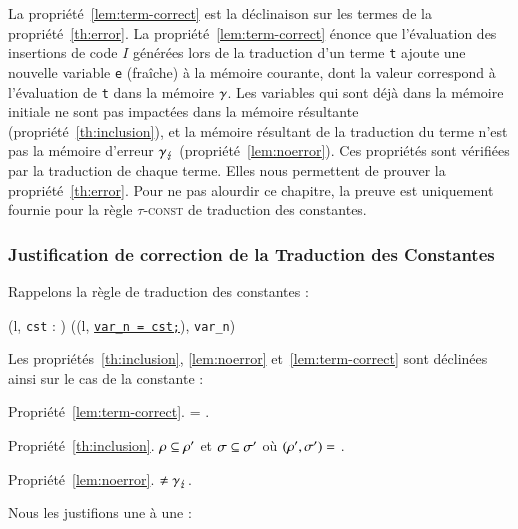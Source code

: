 La propriété~\ref{lem:term-correct} est la déclinaison sur les termes de la
propriété~\ref{th:error}.
La propriété~\ref{lem:term-correct} énonce que l'évaluation des insertions de
code $I$ générées lors de la traduction d'un terme \lstinline't' ajoute une
nouvelle variable \lstinline'e' (fraîche) à la mémoire courante, dont la valeur
correspond à l'évaluation de \lstinline't' dans la mémoire $\gamma$.
Les variables qui sont déjà dans la mémoire initiale ne sont pas
impactées dans la mémoire résultante (propriété~\ref{th:inclusion}), et
la mémoire résultant de la traduction du terme n'est pas la mémoire d'erreur
$\gamma_\lightning$ (propriété~\ref{lem:noerror}).
Ces propriétés sont vérifiées par la traduction de chaque terme.
Elles nous permettent de prouver la propriété~\ref{th:error}.
Pour ne pas alourdir ce chapitre, la preuve est uniquement fournie pour la règle
\textsc{$\tau$-const} de traduction des constantes.


\subsubsection{Justification de correction de la Traduction des Constantes}

Rappelons la règle de traduction des constantes :

{
  {}
  { (l, \mbox{\lstinline'cst'} : ) 
    ((l, \Zinit\underline{\mbox{\lstinline'var_n = cst;'}}),
    \mbox{\lstinline'var_n'}) }{}
}

Les propriétés~\ref{th:inclusion}, \ref{lem:noerror} et~\ref{lem:term-correct}
sont déclinées ainsi sur le cas de la constante :

Propriété~\ref{lem:term-correct}.  =
.


Propriété~\ref{th:inclusion}.
$\rho \subseteq \rho'$ et $\sigma \subseteq \sigma'$ où
 $(\rho', \sigma') =$
.


Propriété~\ref{lem:noerror}.
$\neq \gamma_\lightning$.

Nous les justifions une à une :

